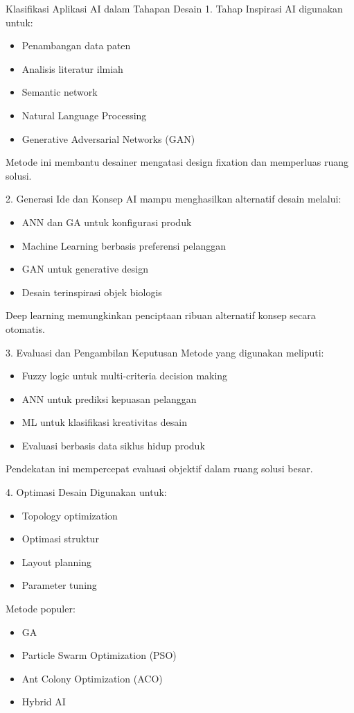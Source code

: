 \documentclass{article}
\begin{document}
Klasifikasi Aplikasi AI dalam Tahapan Desain
1. Tahap Inspirasi
AI digunakan untuk: \cite{neapolitan2018artificial} \begin{itemize}
\item Penambangan data paten
\item Analisis literatur ilmiah
\item Semantic network
\item Natural Language Processing
\item Generative Adversarial Networks (GAN)
\end{itemize}
Metode ini membantu desainer mengatasi design fixation dan memperluas ruang solusi.

2. Generasi Ide dan Konsep
AI mampu menghasilkan alternatif desain melalui: \cite{salehi2018emerging} \begin{itemize}
\item ANN dan GA untuk konfigurasi produk
\item Machine Learning berbasis preferensi pelanggan
\item GAN untuk generative design
\item Desain terinspirasi objek biologis
\end{itemize}
Deep learning memungkinkan penciptaan ribuan alternatif konsep secara otomatis.

3. Evaluasi dan Pengambilan Keputusan
Metode yang digunakan meliputi: \cite{talbi2009meta} \begin{itemize}
\item Fuzzy logic untuk multi-criteria decision making
\item ANN untuk prediksi kepuasan pelanggan
\item ML untuk klasifikasi kreativitas desain
\item Evaluasi berbasis data siklus hidup produk
\end{itemize}
Pendekatan ini mempercepat evaluasi objektif dalam ruang solusi besar.

4. Optimasi Desain
Digunakan untuk: \cite{gen2008network} \begin{itemize}
\item  Topology optimization
\item  Optimasi struktur
\item  Layout planning
\item  Parameter tuning
\end{itemize}

Metode populer: \begin{itemize}
\item GA
\item Particle Swarm Optimization (PSO)
\item Ant Colony Optimization (ACO)
\item Hybrid AI
\end{itemize}
\end{document}
